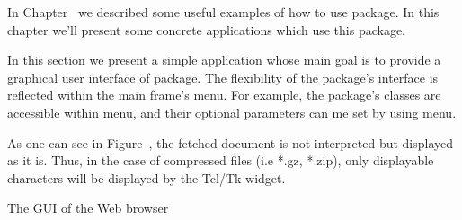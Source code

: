\documentclass{ozdoc}
\begin{document}
\begin{mozartCODEDISPLAY}
{\mozartSPACE{}\mozartSPACE{}\mozartSPACE{}\mozartSPACE{}\mozartSPACE{}\mozartSPACE{}\mozartSPACE{}\mozartSPACE{}\mozartSPACE{}}\mozartFACETEXT{\mozartNEWLINE
\mozartSPACE{}\mozartSPACE{}\mozartSPACE{}\mozartSPACE{}\mozartSPACE{}\mozartSPACE{}}\mozartFACETEXT{\mozartNEWLINE
}\mozartFACETEXT{\mozartNEWLINE
\mozartSPACE{}\mozartSPACE{}\mozartSPACE{}}\mozartFACETEXT{\mozartSPACE{}}\mozartFACETEXT{\mozartNEWLINE
}\end{mozartCODEDISPLAY}


\label{CHAPTER.APPLICATIONS}



In Chapter~ we described some useful examples of how to use  package. In this chapter we'll present some concrete applications which use this package. \mozartEMPTY





In this section we present a simple application whose main goal is to provide a graphical user interface of  package. The flexibility of the package's interface is reflected within the main frame's menu. For example, the package's classes are accessible within  menu, and their optional parameters can me set by using  menu.  \mozartEMPTY


As one can see in Figure~, the fetched document is not interpreted but displayed as it is. Thus, in the case of compressed files (i.e *.gz, *.zip), only displayable characters will be displayed by the Tcl/Tk  widget.   \mozartEMPTY
 \mozartEMPTY
\begin{mozartFIGURENODISPLAY}\caption{\label{FIGURE.BWOZGUI}The GUI of the Web browser}\begin{mozartPICEXTDISPLAY}\end{mozartPICEXTDISPLAY}\end{mozartFIGURENODISPLAY}
\end{document}
